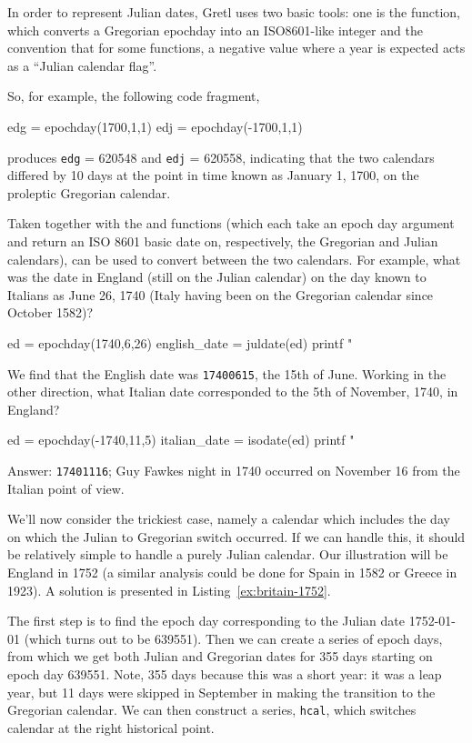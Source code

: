 In order to represent Julian dates, Gretl uses two basic tools: one is
the  function, which converts a Gregorian epochday into
an ISO8601-like integer and the convention that for some functions,
a negative value where a year is expected acts as a ``Julian calendar
flag''.

So, for example, the following code fragment,
%
\begin{code}
edg = epochday(1700,1,1)
edj = epochday(-1700,1,1)
\end{code}
%
produces \texttt{edg} = 620548 and \texttt{edj} = 620558, indicating
that the two calendars differed by 10 days at the point in time
known as January 1, 1700, on the proleptic Gregorian calendar.

Taken together with the  and 
functions (which each take an epoch day argument and return an ISO
8601 basic date on, respectively, the Gregorian and Julian calendars),
 can be used to convert between the two calendars.
For example, what was the date in England (still on the Julian
calendar) on the day known to Italians as June 26, 1740 (Italy having
been on the Gregorian calendar since October 1582)?
%
\begin{code}
ed = epochday(1740,6,26)
english_date = juldate(ed)
printf "%
\end{code}
%
We find that the English date was \texttt{17400615}, the 15th of June.
Working in the other direction, what Italian date corresponded to the
5th of November, 1740, in England?
%
\begin{code}
ed = epochday(-1740,11,5)
italian_date = isodate(ed)
printf "%
\end{code}
%
Answer: \texttt{17401116}; Guy Fawkes night in 1740 occurred on 
November 16 from the Italian point of view.

We'll now consider the trickiest case, namely a calendar which includes
the day on which the Julian to Gregorian switch occurred. If we can
handle this, it should be relatively simple to handle a purely Julian
calendar. Our illustration will be England in 1752 (a similar analysis
could be done for Spain in 1582 or Greece in 1923). A solution
is presented in Listing~\ref{ex:britain-1752}.

The first step is to find the epoch day corresponding to the Julian
date 1752-01-01 (which turns out to be 639551). Then we can create a
series of epoch days, from which we get both Julian and Gregorian
dates for 355 days starting on epoch day 639551. Note, 355 days
because this was a short year: it was a leap year, but 11 days were
skipped in September in making the transition to the Gregorian
calendar. We can then construct a series, \texttt{hcal}, which
switches calendar at the right historical point.


